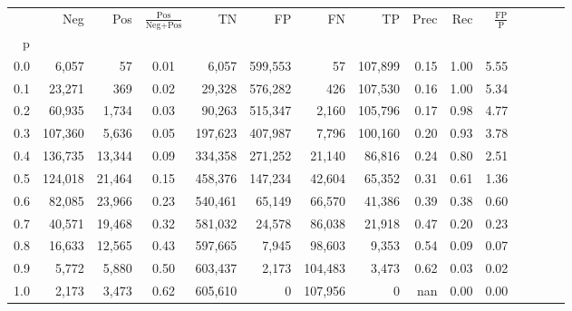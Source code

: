\begin{tabular}{rrrcrrrrrrrrrrr}
\toprule
{} &      Neg &     Pos & $\frac{\text{Pos}}{\text{Neg}+\text{Pos}}$ &       TN &       FP &       FN &       TP &  Prec &   Rec & $\frac{\text{FP}}{\text{P}}$ \\
p   &          &         &                                            &          &          &          &          &       &       &                              \\
\midrule
0.0 &    6,057 &      57 &                                       0.01 &    6,057 &  599,553 &       57 &  107,899 &  0.15 &  1.00 &                         5.55 \\
0.1 &   23,271 &     369 &                                       0.02 &   29,328 &  576,282 &      426 &  107,530 &  0.16 &  1.00 &                         5.34 \\
0.2 &   60,935 &   1,734 &                                       0.03 &   90,263 &  515,347 &    2,160 &  105,796 &  0.17 &  0.98 &                         4.77 \\
0.3 &  107,360 &   5,636 &                                       0.05 &  197,623 &  407,987 &    7,796 &  100,160 &  0.20 &  0.93 &                         3.78 \\
0.4 &  136,735 &  13,344 &                                       0.09 &  334,358 &  271,252 &   21,140 &   86,816 &  0.24 &  0.80 &                         2.51 \\
0.5 &  124,018 &  21,464 &                                       0.15 &  458,376 &  147,234 &   42,604 &   65,352 &  0.31 &  0.61 &                         1.36 \\
0.6 &   82,085 &  23,966 &                                       0.23 &  540,461 &   65,149 &   66,570 &   41,386 &  0.39 &  0.38 &                         0.60 \\
0.7 &   40,571 &  19,468 &                                       0.32 &  581,032 &   24,578 &   86,038 &   21,918 &  0.47 &  0.20 &                         0.23 \\
0.8 &   16,633 &  12,565 &                                       0.43 &  597,665 &    7,945 &   98,603 &    9,353 &  0.54 &  0.09 &                         0.07 \\
0.9 &    5,772 &   5,880 &                                       0.50 &  603,437 &    2,173 &  104,483 &    3,473 &  0.62 &  0.03 &                         0.02 \\
1.0 &    2,173 &   3,473 &                                       0.62 &  605,610 &        0 &  107,956 &        0 &   nan &  0.00 &                         0.00 \\
\bottomrule
\end{tabular}
